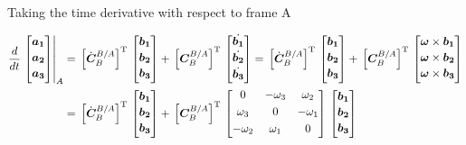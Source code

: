 Taking the time derivative with respect to frame A

\begin{align}{\label{eqn:C_B_Amatrix_timeDerivative}}
\begin{split}
\frac{d}{dt}
\left.
\begin{bmatrix}
\bm{a_1}\\[0.2em]
\bm{a_2}\\[0.2em]
\bm{a_3}\\[0.2em]
\end{bmatrix}
\right|_A &=\,
\Big[{\dot{\bm{C}}_B^{B/A}}\Big]^{\rm T}
\,
\begin{bmatrix}
\bm{b_1}\\[0.2em]
\bm{b_2}\\[0.2em]
\bm{b_3}\\[0.2em]
\end{bmatrix}
+\,
\Big[{\bm{C}_B^{B/A}}\Big]^{\rm T}
\,
\begin{bmatrix}
\dot{\bm{b_1}}\\[0.2em]
\dot{\bm{b_2}}\\[0.2em]
\dot{\bm{b_3}}\\[0.2em]
\end{bmatrix}
=\,
\Big[{\dot{\bm{C}}_B^{B/A}}\Big]^{\rm T}
\,
\begin{bmatrix}
\bm{b_1}\\[0.2em]
\bm{b_2}\\[0.2em]
\bm{b_3}\\[0.2em]
\end{bmatrix}
+\,
\Big[{\bm{C}_B^{B/A}}\Big]^{\rm T}
\,
\begin{bmatrix}
\bm{\omega} \times \bm{b_1}\\[0.2em]
\bm{\omega} \times \bm{b_2}\\[0.2em]
\bm{\omega} \times \bm{b_3}\\[0.2em]
\end{bmatrix}
\\
& =\,
\Big[{\dot{\bm{C}}_B^{B/A}}\Big]^{\rm T}
\,
\begin{bmatrix}
\bm{b_1}\\[0.2em]
\bm{b_2}\\[0.2em]
\bm{b_3}\\[0.2em]
\end{bmatrix}
+\,
\Big[{\bm{C}_B^{B/A}}\Big]^{\rm T}
\,
\begin{bmatrix}
0 & - \omega_3 & \omega_2 \\[0.3em]
\omega_3 & 0 & - \omega_1 \\[0.3em]
- \omega_2 & \omega_1 & 0\\[0.3em]
\end{bmatrix}
\,
\begin{bmatrix}
\bm{b_1}\\[0.2em]
\bm{b_2}\\[0.2em]
\bm{b_3}\\[0.2em]
\end{bmatrix}
\end{split}
\end{align}

